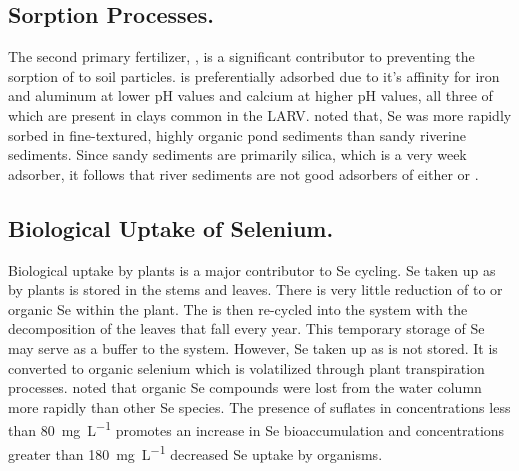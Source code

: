 \begin{linenumbers}[1]
\subsection*{Sorption Processes.}
The second primary fertilizer, \phosphate, is a significant contributor to preventing the sorption of \selenite to soil particles.  \phosphate is preferentially adsorbed due to it's affinity for iron and aluminum at lower pH values and calcium at higher pH values, all three of which are present in clays common in the LARV.  \textcite{Besser1989} noted that, Se was more rapidly sorbed in fine-textured, highly organic pond sediments than sandy riverine sediments.  Since sandy sediments are primarily silica, which is a very week adsorber, it follows that river sediments are not good adsorbers of either \phosphate or \selenite \parencite{Oram2008}.

\subsection*{Biological Uptake of Selenium.}
Biological uptake by plants is a major contributor to Se cycling.  Se taken up as \selenate by plants is stored in the stems and leaves.  There is very little reduction of \selenate to \selenite or organic Se within the plant.  The \selenate is then re-cycled into the system with the decomposition of the leaves that fall every year.  This temporary storage of Se may serve as a buffer to the system.  However, Se taken up as \selenite is not stored.  It is converted to organic selenium which is volatilized through plant transpiration processes.  \textcite{Besser1989} noted that organic Se compounds were lost from the water column more rapidly than other Se species.  The presence of suflates in concentrations less than \SI{80}{\milli\gram\per\liter} promotes an increase in Se bioaccumulation and concentrations greater than \SI{180}{\milli\gram\per\liter} decreased Se uptake by organisms.   


\end{linenumbers}
